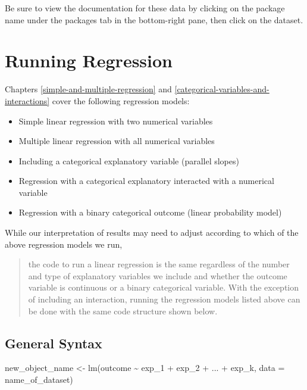 \documentclass[
]{book}
\makeatletter
\newenvironment{Shaded}{\begin{snugshade}}{\end{snugshade}}
\newcommand{\AttributeTok}[1]{\textcolor[rgb]{0.61,0.61,0.61}{#1}}
\newcommand{\FunctionTok}[1]{\textcolor[rgb]{0,0,0}{#1}}
\newcommand{\NormalTok}[1]{#1}
\newcommand{\OtherTok}[1]{\textcolor[rgb]{0.37,0.37,0.37}{#1}}
\newcommand{\SpecialCharTok}[1]{\textcolor[rgb]{0,0,0}{#1}}
\providecommand{\tightlist}{%
  \setlength{\itemsep}{0pt}\setlength{\parskip}{0pt}}
\newenvironment{kframe}{%
\medskip{}
\setlength{\fboxsep}{.8em}
 \def\at@end@of@kframe{}%
 \ifinner\ifhmode%
  \def\at@end@of@kframe{\end{minipage}}%
  \begin{minipage}{\columnwidth}%
 \fi\fi%
 \def\FrameCommand##1{\hskip\@totalleftmargin \hskip-\fboxsep
 \colorbox{shadecolor}{##1}\hskip-\fboxsep
     \hskip-\linewidth \hskip-\@totalleftmargin \hskip\columnwidth}%
 \MakeFramed {\advance\hsize-\width
   \@totalleftmargin\z@ \linewidth\hsize
   \@setminipage}}%
 {\par\unskip\endMakeFramed%
 \at@end@of@kframe}
\renewenvironment{Shaded}{\begin{kframe}}{\end{kframe}}
\makeatother
\begin{document}
Be sure to view the documentation for these data by clicking on the package name under the packages tab in the bottom-right pane, then click on the dataset.

\hypertarget{running-regression}{%
\section{Running Regression}\label{running-regression}}

Chapters \ref{simple-and-multiple-regression} and \ref{categorical-variables-and-interactions} cover the following regression models:

\begin{itemize}
\tightlist
\item
  Simple linear regression with two numerical variables
\item
  Multiple linear regression with all numerical variables
\item
  Including a categorical explanatory variable (parallel slopes)
\item
  Regression with a categorical explanatory interacted with a numerical variable
\item
  Regression with a binary categorical outcome (linear probability model)
\end{itemize}

While our interpretation of results may need to adjust according to which of the above regression models we run,

\begin{quote}
the code to run a linear regression is the same regardless of the number and type of explanatory variables we include and whether the outcome variable is continuous or a binary categorical variable. With the exception of including an interaction, running the regression models listed above can be done with the same code structure shown below.
\end{quote}

\hypertarget{general-syntax}{%
\subsection{General Syntax}\label{general-syntax}}

\begin{Shaded}
\begin{Highlighting}[]
\NormalTok{new\_object\_name }\OtherTok{\textless{}{-}} \FunctionTok{lm}\NormalTok{(outcome }\SpecialCharTok{\textasciitilde{}}\NormalTok{ exp\_1 }\SpecialCharTok{+}\NormalTok{ exp\_2 }\SpecialCharTok{+}\NormalTok{ ... }\SpecialCharTok{+}\NormalTok{ exp\_k, }\AttributeTok{data =}\NormalTok{ name\_of\_dataset)}
\end{Highlighting}
\end{Shaded}
\end{document}

